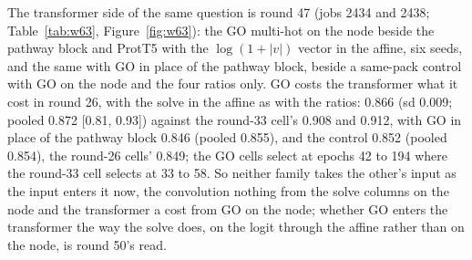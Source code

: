 The transformer side of the same question is round 47 (jobs 2434 and 2438;
Table~\ref{tab:w63}, Figure~\ref{fig:w63}): the GO multi-hot on the node beside the
pathway block and ProtT5 with the $\log(1 + |v|)$ vector in the affine, six seeds, and
the same with GO in place of the pathway block, beside a same-pack control with GO on
the node and the four ratios only. GO costs the transformer what it cost in round 26,
with the solve in the affine as with the ratios: 0.866 (sd 0.009; pooled 0.872 [0.81,
0.93]) against the round-33 cell's 0.908 and 0.912, with GO in place of the pathway
block 0.846 (pooled 0.855), and the control 0.852 (pooled 0.854), the round-26 cells'
0.849; the GO cells select at epochs 42 to 194 where the round-33 cell selects at 33
to 58. So neither family takes the other's input as the input enters it now, the
convolution nothing from the solve columns on the node and the transformer a cost
from GO on the node; whether GO enters the transformer the way the solve does, on the
logit through the affine rather than on the node, is round 50's read.




